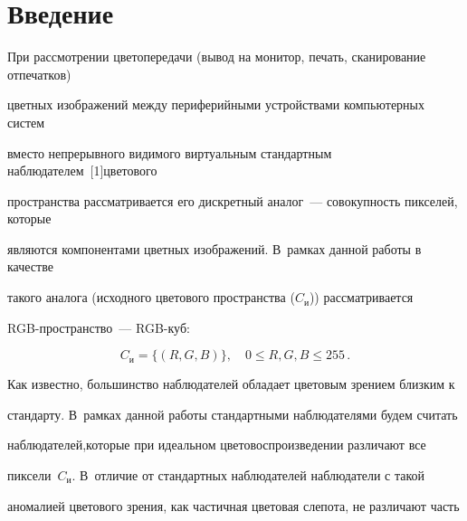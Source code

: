  \thispagestyle{empty}


 


 \vspace*{-8pt}





\section{Введение}





\vspace*{-2pt}





При рассмотрении цветопередачи (вывод на монитор, печать, сканирование отпечатков)


цветных изображений между периферийными устройствами компьютерных систем


вместо непрерывного видимого виртуальным стандартным наблюдателем~[1]\linebreak цветового


пространства рассматривается его дискретный аналог~--- совокупность пикселей, которые


являются компонентами цветных изображений. В~рамках данной работы в качестве


такого аналога (исходного цветового пространства ($C_{\mathrm{и}}$)) рас\-смат\-ри\-ва\-ет\-ся


RGB-пространство~--- RGB-куб:


$$


C_{\mathrm{и}}=\{(R,G,B)\},\quad  0\leq R,G,B\leq 255\,.


$$





Как известно, большинство наблюдателей обладает цветовым зрением близким к


стандарту. В~рамках данной работы стандартными наблюдателями будем считать


наблюдателей,\linebreak которые при идеальном цветовоспроизведении различают все\linebreak


пиксели~$C_{\mathrm{и}}$. В~отличие от стандартных наблюдателей наблюдатели с такой


аномалией цветового зрения, как частичная цветовая слепота, не различают часть


